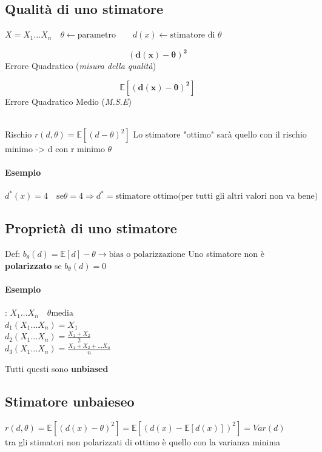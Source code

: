 \documentclass[]{article}
\newcommand{\ev}{\mathbb{E}[X]}
\renewcommand{\ev}[1]{\mathbb{E}[#1]}
\begin{document}
    \subsection{Qualità di uno stimatore}
    $X = X_1 \ldots X_n \quad \theta \leftarrow \text{parametro} \quad \quad d(x) \leftarrow \text{stimatore di $\theta$}$ \\
    \begin{minipage}{0.5\textwidth}
        \[ \boldsymbol{(d(x) - \theta)^2}\] Errore Quadratico (\textit{misura della qualità})
    \end{minipage}
    \begin{minipage}{0.5\textwidth}
        \[ \boldsymbol{\ev{(d(x)-\theta)^2}} \] Errore Quadratico Medio (\textit{M.S.E})
    \end{minipage} \\
    Rischio $r(d, \theta) = \ev{(d-\theta)^2}$ 
    Lo stimatore "ottimo" sarà quello con il rischio minimo -> d con r minimo $\theta$
    \paragraph{Esempio}
    $d^* (x) = 4 \quad \text{se} \theta = 4 \Rightarrow d^* = \text{stimatore ottimo(per tutti gli altri valori non va bene)}$
    \subsection{Proprietà di uno stimatore}
    Def: $b_\theta(d) = \ev{d} - \theta \rightarrow \text{bias o polarizzazione}$
    Uno stimatore non è \textbf{polarizzato} se $b_\theta(d) = 0$
    \paragraph{Esempio}:
    $X_1 \ldots X_n \quad \theta \text{media}$ \\
    $d_1(X_1 \ldots X_n) = X_1$ \\
    $d_2(X_1 \ldots X_n) = \frac{X_1 + X_2}{2}$ \\
    $d_3(X_1 \ldots X_n) = \frac{X_1 + X_2 + \ldots X_n}{n}$
    \centerline{Tutti questi sono \textbf{unbiased}}
    \subsection{Stimatore unbaieseo}
    $r(d, \theta) = \ev{(d(x) - \theta)^2} = \ev{(d(x) - \ev{d(x)})^2} = Var(d)$ \\
    tra gli stimatori non polarizzati di ottimo è quello con la varianza minima
\end{document}
